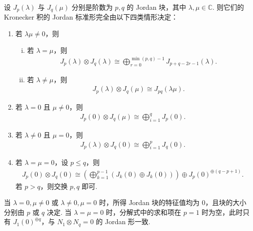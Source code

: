 \documentclass[../../main.tex]{subfiles}%
\begin{document}
\begin{theorem}\label{theorem:Kronecker积定理}
设 $J_p(\lambda)$ 与 $J_q(\mu)$ 分别是阶数为 $p,q$ 的 Jordan 块，其中 $\lambda,\mu\in\mathbb C$. 则它们的 Kronecker 积的 Jordan 标准形完全由以下四类情形决定：
\begin{enumerate}[(1)]
\item 若 $\lambda\mu\neq 0$，则
\begin{enumerate}[(i)]
\item 若 $\lambda=\mu$，则
\begin{align}
J_p(\lambda)\otimes J_q(\lambda) \cong \bigoplus_{r=0}^{\min(p,q)-1} J_{p+q-2r-1}(\lambda).\label{KronSameNonzero}
\end{align}
\item 若 $\lambda\neq\mu$，则
\begin{align}
J_p(\lambda)\otimes J_q(\mu) \cong J_{pq}(\lambda\mu).\label{KronDiffNonzero}
\end{align}
\end{enumerate}
\item 若 $\lambda=0$ 且 $\mu\neq 0$，则
\begin{align}
J_p(0)\otimes J_q(\mu) \cong \bigoplus_{i=1}^{q} J_p(0).\label{KronFirstZero}
\end{align}
\item 若 $\lambda\neq 0$ 且 $\mu=0$，则
\begin{align}
J_p(\lambda)\otimes J_q(0) \cong \bigoplus_{i=1}^{p} J_q(0).\label{KronSecondZero}
\end{align}
\item 若 $\lambda=\mu=0$，设 $p\leqslant q$，则
\begin{align}
J_p(0)\otimes J_q(0) \cong \left(\bigoplus_{k=1}^{p-1} (J_k(0)\oplus J_k(0))\right) \oplus J_p(0)^{\oplus (q-p+1)}.\label{KronBothZero}
\end{align}
若 $p>q$，则交换 $p,q$ 即可.
\end{enumerate}
\end{theorem}
\begin{remark}
当 $\lambda=0,\mu\neq 0$ 或 $\lambda\neq 0,\mu=0$ 时，所得 Jordan 块的特征值均为 $0$，且块的大小分别由 $p$ 或 $q$ 决定. 当 $\lambda=\mu=0$ 时，分解式中的求和项在 $p=1$ 时为空，此时只有 $J_1(0)^{\oplus q}$，与 $N_1\otimes N_q=0$ 的 Jordan 形一致.
\end{remark}
\end{document}
